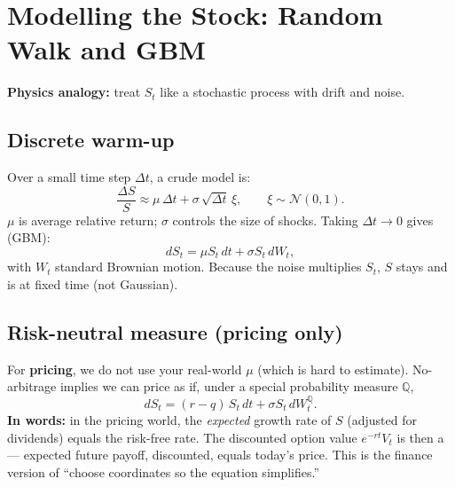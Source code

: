 \section{Modelling the Stock: Random Walk and GBM}
\label{sec:sde-intuition}
\textbf{Physics analogy:} treat $S_t$ like a stochastic process with drift and noise.

\subsection{Discrete warm-up}
Over a small time step $\Delta t$, a crude model is:
\[
  \frac{\Delta S}{S} \approx \mu\,\Delta t + \sigma\,\sqrt{\Delta t}\,\xi,
  \qquad \xi \sim \mathcal{N}(0,1).
\]
$\mu$ is average relative return; $\sigma$ controls the size of shocks. 
Taking $\Delta t \to 0$ gives  (GBM):
\begin{equation}
  dS_t = \mu S_t\,dt + \sigma S_t\,dW_t ,
  \label{eq:gbm}
\end{equation}
with $W_t$ standard Brownian motion. Because the noise multiplies $S_t$, $S$ stays 
 and is  at fixed time (not Gaussian).

\subsection{Risk-neutral measure (pricing only)}
For \textbf{pricing}, we do not use your real-world $\mu$ (which is hard to estimate). 
No-arbitrage implies we can price as if, under a special probability measure 
$\mathbb{Q}$,
\begin{equation}
  dS_t = (r - q)\,S_t\,dt + \sigma S_t\,dW_t^{\mathbb{Q}} .
  \label{eq:gbm-rn}
\end{equation}
\textbf{In words:} in the pricing world, the \emph{expected} growth rate of $S$ 
(adjusted for dividends) equals the risk-free rate. The discounted option value 
$e^{-rt}V_t$ is then a  --- expected future payoff, 
discounted, equals today's price. This is the finance version of ``choose coordinates 
so the equation simplifies.''


